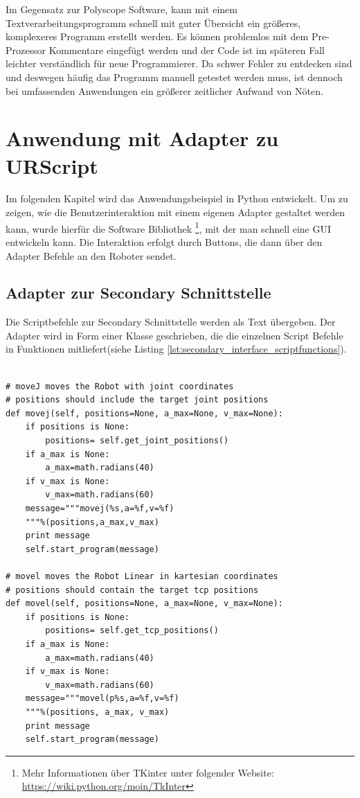 Im Gegensatz zur Polyscope Software, kann mit einem Textverarbeitungsprogramm schnell mit guter Übersicht ein größeres, komplexeres Programm erstellt werden. Es können problemlos mit dem Pre-Prozessor Kommentare eingefügt werden und der Code ist im späteren Fall leichter verständlich für neue Programmierer. Da schwer Fehler zu entdecken sind und deswegen häufig das Programm manuell getestet werden muss, ist dennoch bei umfassenden Anwendungen ein größerer zeitlicher Aufwand von Nöten.

\section{Anwendung mit Adapter zu URScript}
\label{sec:script_hoerherer_schicht_rel}

Im folgenden Kapitel wird das Anwendungsbeispiel in Python entwickelt. Um zu zeigen, wie die Benutzerinteraktion mit einem eigenen Adapter gestaltet werden kann, wurde hierfür die Software Bibliothek \footnote{Mehr Informationen über TKinter unter folgender Website: \url{https://wiki.python.org/moin/TkInter}}, mit der man schnell eine \ac{GUI} entwickeln kann. Die Interaktion erfolgt durch Buttons, die dann über den Adapter Befehle an den Roboter sendet.

\subsection{Adapter zur Secondary Schnittstelle}
\label{beschreibung_script_hoeher_schicht}

Die Scriptbefehle zur Secondary Schnittstelle werden als Text übergeben. Der Adapter wird in Form einer Klasse geschrieben, die die einzelnen Script Befehle in Funktionen mitliefert(siehe Listing \ref{lst:secondary_interface_scriptfunctions}).

\begin{lstlisting}[caption={Ausschnitt zeigt Funktionen, die Scriptbefehle in der Adapter-Klasse umsetzt}, label=lst:secondary_interface_scriptfunctions ,captionpos=b]

# moveJ moves the Robot with joint coordinates
# positions should include the target joint positions
def movej(self, positions=None, a_max=None, v_max=None):
    if positions is None:
        positions= self.get_joint_positions()
    if a_max is None:
        a_max=math.radians(40)
    if v_max is None:
        v_max=math.radians(60)
    message="""movej(%s,a=%f,v=%f)
    """%(positions,a_max,v_max)
    print message
    self.start_program(message)

# movel moves the Robot Linear in kartesian coordinates
# positions should contain the target tcp positions
def movel(self, positions=None, a_max=None, v_max=None):
    if positions is None:
        positions= self.get_tcp_positions()
    if a_max is None:
        a_max=math.radians(40)
    if v_max is None:
        v_max=math.radians(60)
    message="""movel(p%s,a=%f,v=%f)
    """%(positions, a_max, v_max)
    print message
    self.start_program(message)
\end{lstlisting}


